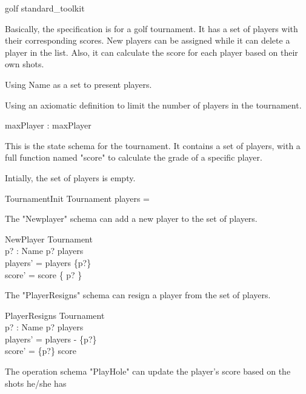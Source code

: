 \documentclass{llncs}
\begin{document}
\begin{zsection}
\SECTION golf \parents standard\_toolkit
\end{zsection}

Basically, the specification is for a golf tournament. It has a set of players with their corresponding
scores. New players can be assigned while it can delete a player in the list. Also, it can calculate
the score for each player based on their own shots.


Using Name as a set to present players.
\begin{zed}
[Name]
\end{zed}
Using an axiomatic definition to limit the number of players in the tournament.
\begin{axdef}
maxPlayer : \nat
\where maxPlayer 
\end{axdef}
This is the state schema for the tournament. It contains a set of players, with a full function
named "score" to calculate the grade of a specific player.

Intially, the set of players is empty.
\begin{schema}{TournamentInit}
Tournament
\where players = \emptyset
\end{schema}

The "Newplayer" schema can add a new player to the set of players.
\begin{schema}{NewPlayer}
\Delta Tournament \\
p? : Name
\where p? \notin players \\
players' = players \cup \{p?\} \\
score' = score \cup \{ p?  \}
\end{schema}

The "PlayerResigns" schema can resign a player from the set of players.
\begin{schema}{PlayerResigns}
\Delta Tournament \\
p? : Name
\where p? \in players\\
players' = players - \{p?\} \\
score' = \{p?\} \ndres score
\end{schema}

The operation schema "PlayHole" can update the player's score based on the shots he/she has
\end{document}
